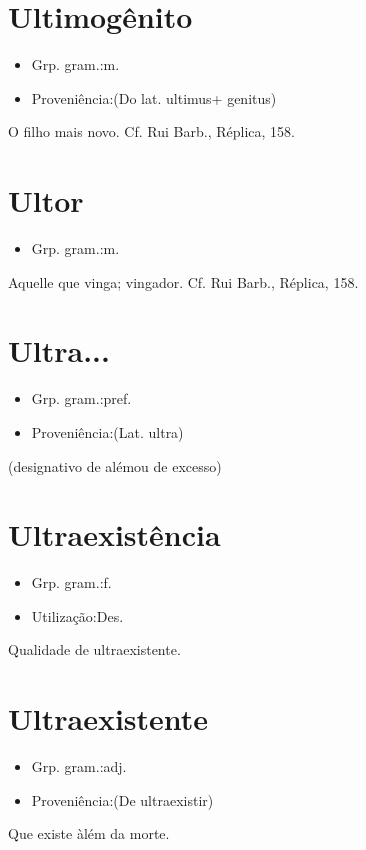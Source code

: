 \documentclass{article}
\begin{document}
\section{Ultimogênito}
\begin{itemize}
\item {Grp. gram.:m.}
\end{itemize}
\begin{itemize}
\item {Proveniência:(Do lat. \textunderscore ultimus\textunderscore  + \textunderscore genitus\textunderscore )}
\end{itemize}
O filho mais novo. Cf. Rui Barb., \textunderscore Réplica\textunderscore , 158.
\section{Ultor}
\begin{itemize}
\item {Grp. gram.:m.}
\end{itemize}
Aquelle que vinga; vingador. Cf. Rui Barb., \textunderscore Réplica\textunderscore , 158.
\section{Ultra...}
\begin{itemize}
\item {Grp. gram.:pref.}
\end{itemize}
\begin{itemize}
\item {Proveniência:(Lat. \textunderscore ultra\textunderscore )}
\end{itemize}
(designativo de \textunderscore além\textunderscore  ou de \textunderscore excesso\textunderscore )
\section{Ultraexistência}
\begin{itemize}
\item {Grp. gram.:f.}
\end{itemize}
\begin{itemize}
\item {Utilização:Des.}
\end{itemize}
Qualidade de ultraexistente.
\section{Ultraexistente}
\begin{itemize}
\item {Grp. gram.:adj.}
\end{itemize}
\begin{itemize}
\item {Proveniência:(De \textunderscore ultraexistir\textunderscore )}
\end{itemize}
Que existe àlém da morte.
\end{document}
